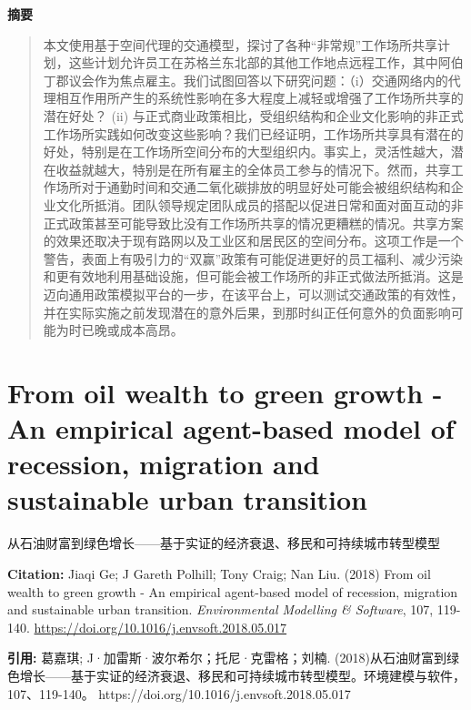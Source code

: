 \noindent\textbf{摘要}\par
\begin{quote}\small
本文使用基于空间代理的交通模型，探讨了各种“非常规”工作场所共享计划，这些计划允许员工在苏格兰东北部的其他工作地点远程工作，其中阿伯丁郡议会作为焦点雇主。我们试图回答以下研究问题：（i）交通网络内的代理相互作用所产生的系统性影响在多大程度上减轻或增强了工作场所共享的潜在好处？ (ii) 与正式商业政策相比，受组织结构和企业文化影响的非正式工作场所实践如何改变这些影响？我们已经证明，工作场所共享具有潜在的好处，特别是在工作场所空间分布的大型组织内。事实上，灵活性越大，潜在收益就越大，特别是在所有雇主的全体员工参与的情况下。然而，共享工作场所对于通勤时间和交通二氧化碳排放的明显好处可能会被组织结构和企业文化所抵消。团队领导规定团队成员的搭配以促进日常和面对面互动的非正式政策甚至可能导致比没有工作场所共享的情况更糟糕的情况。共享方案的效果还取决于现有路网以及工业区和居民区的空间分布。这项工作是一个警告，表面上有吸引力的“双赢”政策有可能促进更好的员工福利、减少污染和更有效地利用基础设施，但可能会被工作场所的非正式做法所抵消。这是迈向通用政策模拟平台的一步，在该平台上，可以测试交通政策的有效性，并在实际实施之前发现潜在的意外后果，到那时纠正任何意外的负面影响可能为时已晚或成本高昂。
\end{quote}

\vspace{0.5em}
\chapter{From oil wealth to green growth - An empirical agent-based model of recession, migration and sustainable urban transition}
\begin{center}\small 从石油财富到绿色增长——基于实证的经济衰退、移民和可持续城市转型模型\end{center}

\noindent\textbf{Citation:} Jiaqi Ge; J Gareth Polhill; Tony Craig; Nan Liu. (2018) From oil wealth to green growth - An empirical agent-based model of recession, migration and sustainable urban transition. \textit{Environmental Modelling \& Software}, 107, 119-140. \url{https://doi.org/10.1016/j.envsoft.2018.05.017}

\vspace{0.5em}
\noindent\textbf{引用:} 葛嘉琪; J·加雷斯·波尔希尔；托尼·克雷格；刘楠. (2018)从石油财富到绿色增长——基于实证的经济衰退、移民和可持续城市转型模型。环境建模与软件，107、119-140。 https://doi.org/10.1016/j.envsoft.2018.05.017

